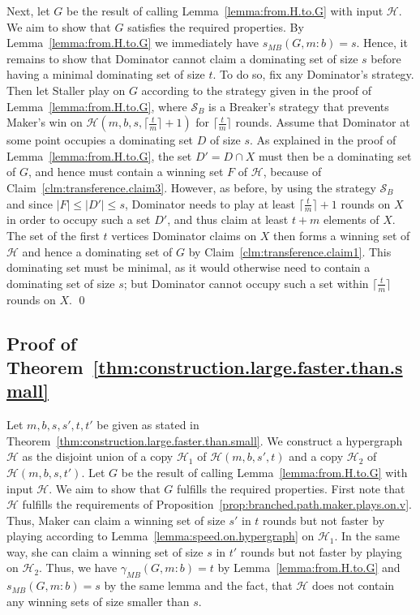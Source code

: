 \documentclass[reqno, 12pt]{amsart}
\numberwithin{equation}{section}
\numberwithin{figure}{section}
\begin{document}
Next, let $G$ be the result of calling Lemma~\ref{lemma:from.H.to.G} with input $\mathcal{H}$. We aim to show that $G$ satisfies the required properties. By Lemma~\ref{lemma:from.H.to.G}
we immediately have
$s_{MB}(G,m:b) = s$. 
Hence, it remains to show that
Dominator cannot claim a dominating set of size $s$ before having a
minimal dominating set of size $t$.
To do so, fix any Dominator's strategy.
Then let Staller play on $G$ according to the strategy given in the proof of 
Lemma~\ref{lemma:from.H.to.G},
where $\mathcal{S}_B$ is a Breaker's strategy
that prevents Maker's win
on $\mathcal{H}(m,b,s,\lceil \frac{t}{m} \rceil + 1)$ 
for $\lceil \frac{t}{m} \rceil$ rounds.
Assume that Dominator at some point occupies a dominating set $D$ of size $s$. As explained 
in the proof of 
Lemma~\ref{lemma:from.H.to.G},
the set $D'=D\cap X$ must then be
a dominating set of $G$, and hence must contain a winning set $F$ of $\mathcal{H}$, because of 
Claim~\ref{clm:transference.claim3}.
However, as before, by using the strategy $\mathcal{S}_B$ and since $|F| \leq |D'|\leq s$, Dominator needs to play at least $\lceil \frac{t}{m} \rceil + 1$ rounds on $X$ 
in order to occupy such a set $D'$, and thus claim at least $t + m$ elements of $X$.
The set of the first $t$ vertices 
Dominator claims on $X$ then forms a winning set of $\mathcal{H}$
and hence a dominating set of $G$ by Claim~\ref{clm:transference.claim1}.
This dominating set must be minimal,
as it would otherwise need to contain a dominating set of size $s$; but Dominator cannot occupy such a set within $\lceil \frac{t}{m} \rceil$ rounds on $X$.
\qed

\subsection{Proof of Theorem~\ref{thm:construction.large.faster.than.small}}
Let $m,b,s,s',t,t'$ be given as stated in Theorem~\ref{thm:construction.large.faster.than.small}. We construct a hypergraph $\mathcal{H}$ as the disjoint union of a copy $\mathcal{H}_1$ of $\mathcal{H}(m,b,s',t)$ and a copy $\mathcal{H}_2$ of $\mathcal{H}(m,b,s,t')$. Let $G$ be the result of calling Lemma~\ref{lemma:from.H.to.G} with input $\mathcal{H}$. We aim to show that $G$ fulfills the required properties. First note that $\mathcal{H}$ fulfills the requirements of Proposition~\ref{prop:branched.path.maker.plays.on.v}. Thus, Maker can claim a winning set of size $s'$ in $t$ rounds but not faster by playing according to Lemma~\ref{lemma:speed.on.hypergraph} on $\mathcal{H}_1$. In the same way, she can claim a winning set of size $s$ in $t'$ rounds but not faster by playing on $\mathcal{H}_2$. Thus, we have $\gamma_{MB}(G,m:b)=t$ by Lemma~\ref{lemma:from.H.to.G} and $s_{MB}(G,m:b)=s$ by the same lemma and the fact, that $\mathcal{H}$ does not contain any winning sets of size smaller than $s$. 
\end{document}
